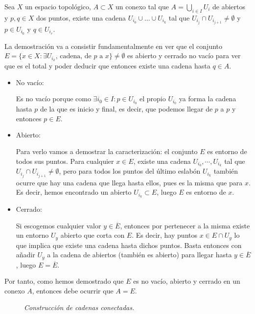 \begin{prop}
Sea $X$ un espacio topológico, $A\subset X$ un conexo tal que $A = \bigcup_{i \in I} U_i$ de abiertos y $p, q \in X$ dos puntos, existe una cadena $U_{i_0} \cup \ldots \cup U_{i_k}$ tal que $U_{i_{j}} \cap U_{i_{j+1}}\neq \emptyset$ y $p \in U_{i_0}$ y $q \in U_{i_r}$. 
\end{prop}
\begin{demo}
La demostración va a consistir fundamentalmente en ver que el conjunto $E = \{x \in X: \exists U_{i_k} \text{, cadena, de } p \text{ a } x\} \neq \emptyset$ es abierto y cerrado no vacío para ver que es el total y poder deducir que entonces existe una cadena hasta $q\in A$.
\begin{itemize}
    \item No vacío: 
   	
   	Es no vacío porque como $\exists i_0 \in I : p\in U_{i_0}$ el propio $U_{i_0}$ ya forma la cadena hasta $p$ de la que es inicio y final, es decir, que podemos llegar de $p$ a $p$ y entonces $p\in E$.
   	
    \item Abierto: 
    
	Para verlo vamos a demostrar la caracterización: el conjunto $E$ es entorno de todos sus puntos. Para cualquier $x\in E$, existe una cadena $U_{i_0}, \cdots, U_{i_k}$ tal que $U_{i_{j}}\cap U_{i_{j+1}} \neq \emptyset$, pero para todos los puntos del último eslabón $U_{i_k}$ también ocurre que hay una cadena que llega hasta ellos, pues es la misma que para $x$. Es decir, hemos encontrado un abierto $U_{i_k}\subset E$, luego $E$ es entorno de $x$.
	
    \item Cerrado:
    
    Si escogemos cualquier valor $y\in \overline{E}$, entonces por pertenecer a la misma existe un entorno $U_y$ abierto que corta con $E$. Es decir, hay puntos $x\in E \cap U_y$ lo que implica que existe una cadena hasta dichos puntos. Basta entonces con añadir $U_y$ a la cadena de abiertos (también es abierto) para llegar hasta $y\in \overline{E}$, luego $E = \overline{E}$.
\end{itemize}
Por tanto, como hemos demostrado que $E$ es no vacío, abierto y cerrado en un conexo $A$, entonces debe ocurrir que $A = E$.
\begin{figure}[H]
    \centering
    \caption{\textit{Construcción de cadenas conectadas.}}
    \label{fig:cadenas-conectadas}
\end{figure}
\end{demo}

